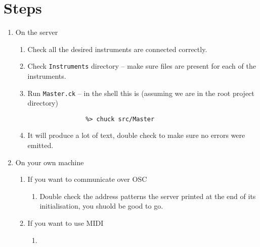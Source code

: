 \documentclass{article}
\begin{document}
\section{Steps}

\begin{enumerate} [\bf 1.]
\item {\large On the server}
	\begin{enumerate} [\bf i.]

		\item{Check all the desired instruments are connected correctly.}
		\item{Check \texttt{Instruments} directory -- make sure files are present for each of the instruments.}
		\item Run \texttt{Master.ck} -- in the shell this is (assuming we are in the root project directory)
		\begin{verbatim}
			    %> chuck src/Master
		\end{verbatim}
		\item  It will produce a lot of text, double check to make sure no errors were emitted.
	\end{enumerate}
\item {\large On your own machine}
	\begin{enumerate} [\bf i.]
		\item {If you want to communicate over OSC}
		\begin{enumerate} [\bf a.]
			\item{Double check the address patterns the server printed at the end of its initialisation, you shuold be good to go.}
		\end{enumerate}
		\item {If you want to use MIDI}
		\begin{enumerate} [\bf a.]
			\item{}
		\end{enumerate}
	\end{enumerate}

\end{enumerate}
\end{document}
